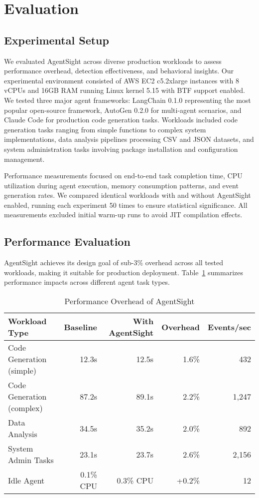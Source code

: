 \section{Evaluation}

\subsection{Experimental Setup}

We evaluated AgentSight across diverse production workloads to assess performance overhead, detection effectiveness, and behavioral insights. Our experimental environment consisted of AWS EC2 c5.2xlarge instances with 8 vCPUs and 16GB RAM running Linux kernel 5.15 with BTF support enabled. We tested three major agent frameworks: LangChain 0.1.0 representing the most popular open-source framework, AutoGen 0.2.0 for multi-agent scenarios, and Claude Code for production code generation tasks. Workloads included code generation tasks ranging from simple functions to complex system implementations, data analysis pipelines processing CSV and JSON datasets, and system administration tasks involving package installation and configuration management.

Performance measurements focused on end-to-end task completion time, CPU utilization during agent execution, memory consumption patterns, and event generation rates. We compared identical workloads with and without AgentSight enabled, running each experiment 50 times to ensure statistical significance. All measurements excluded initial warm-up runs to avoid JIT compilation effects.

\subsection{Performance Evaluation}

AgentSight achieves its design goal of sub-3\% overhead across all tested workloads, making it suitable for production deployment. Table~\ref{tab:performance} summarizes performance impacts across different agent task types.

\begin{table}[h]
\centering
\caption{Performance Overhead of AgentSight}
\label{tab:performance}
\begin{tabular}{lrrrr}
\toprule
Workload Type & Baseline & With AgentSight & Overhead & Events/sec \\
\midrule
Code Generation (simple) & 12.3s & 12.5s & 1.6\% & 432 \\
Code Generation (complex) & 87.2s & 89.1s & 2.2\% & 1,247 \\
Data Analysis & 34.5s & 35.2s & 2.0\% & 892 \\
System Admin Tasks & 23.1s & 23.7s & 2.6\% & 2,156 \\
Idle Agent & 0.1\% CPU & 0.3\% CPU & +0.2\% & 12 \\
\bottomrule
\end{tabular}
\end{table}

